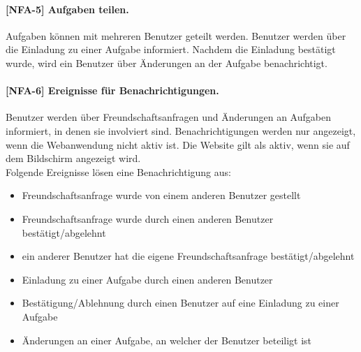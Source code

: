 \paragraph{[NFA-5] Aufgaben teilen.} Aufgaben können mit mehreren Benutzer geteilt werden. Benutzer werden über die Einladung zu einer Aufgabe informiert. Nachdem die Einladung bestätigt wurde, wird ein Benutzer über Änderungen an der Aufgabe benachrichtigt.

\paragraph{[NFA-6] Ereignisse für Benachrichtigungen.} Benutzer werden über Freundschaftsanfragen und Änderungen an Aufgaben informiert, in denen sie involviert sind. Benachrichtigungen werden nur angezeigt, wenn die Webanwendung nicht aktiv ist. Die Website gilt als \glqq aktiv\grqq, wenn sie auf dem Bildschirm angezeigt wird. \\
Folgende Ereignisse lösen eine Benachrichtigung aus:

\begin{itemize}
\setlength{\itemsep}{0pt}%
\setlength{\parskip}{0pt}%
\item Freundschaftsanfrage wurde von einem anderen Benutzer gestellt
\item Freundschaftsanfrage wurde durch einen anderen Benutzer bestätigt/abgelehnt
\item ein anderer Benutzer hat die eigene Freundschaftsanfrage bestätigt/abgelehnt
\item Einladung zu einer Aufgabe durch einen anderen Benutzer
\item Bestätigung/Ablehnung durch einen Benutzer auf eine Einladung zu einer Aufgabe
\item Änderungen an einer Aufgabe, an welcher der Benutzer beteiligt ist
\end{itemize}
